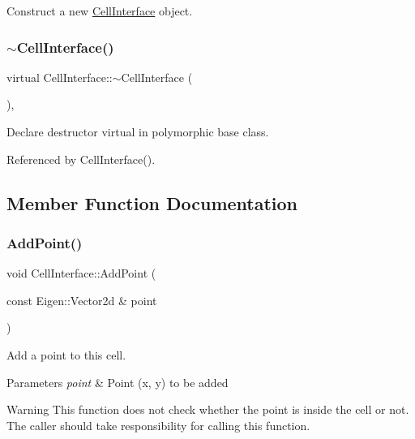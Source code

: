 Construct a new \hyperlink{classCellInterface}{Cell\+Interface} object. 

\mbox{\label{classCellInterface_abf06540d5ecb1d834f512fcf8f10e1fd}} 
\subsubsection{\texorpdfstring{$\sim$\+Cell\+Interface()}{~CellInterface()}}
{\footnotesize\ttfamily virtual Cell\+Interface\+::$\sim$\+Cell\+Interface (\begin{DoxyParamCaption}{ }\end{DoxyParamCaption})\hspace{0.3cm}{\ttfamily [virtual]}, {\ttfamily [default]}}



Declare destructor virtual in polymorphic base class. 



Referenced by Cell\+Interface().



\subsection{Member Function Documentation}
\mbox{\label{classCellInterface_a23d86344bc3de7febd8a5dcae41562d6}} 
\subsubsection{\texorpdfstring{Add\+Point()}{AddPoint()}}
{\footnotesize\ttfamily void Cell\+Interface\+::\+Add\+Point (\begin{DoxyParamCaption}\item[{const Eigen\+::\+Vector2d \&}]{point }\end{DoxyParamCaption})\hspace{0.3cm}{\ttfamily [inline]}}



Add a point to this cell. 


\begin{DoxyParams}{Parameters}
{\em point} & Point (x, y) to be added \\
\hline
\end{DoxyParams}
\begin{DoxyWarning}{Warning}
This function does not check whether the point is inside the cell or not. The caller should take responsibility for calling this function. 
\end{DoxyWarning}


